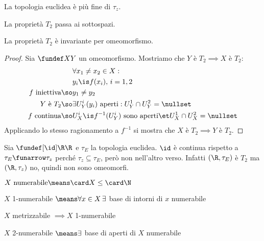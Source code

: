 \begin{oss}
La topologia euclidea è più fine di $\tau_z$.
\end{oss}

\begin{prop}
La proprietà $T_2$ passa ai sottospazi.
\end{prop}

\begin{prop}
La proprietà $T_2$ è invariante per omeomorfismo.
\end{prop}
\begin{proof}
Sia $\fundef XY$ un omeomorfismo. Mostriamo che $Y\text{ è }T_2\implies X\text{ è }T_2$:
\begin{align*}
&\forall x_1\neq x_2\in X:\\
&y_i\is f(x_i),\,i=1,2\\
f\text{ iniettiva}\so&y_1\neq y_2\\
Y\text{ è }T_2\so&\exists U_Y^i(y_i)\text{ aperti}:U_Y^1\cap U_Y^2=\nullset\\
f\text{ continua}\so&U_X^i\is f^{-1}(U_Y^i)\text{ sono aperti}\et U_X^1\cap U_X^2=\nullset
\end{align*}
Applicando lo stesso ragionamento a $f^{-1}$ si mostra che $X\text{ è }T_2\implies Y\text{ è }T_2$.
\end{proof}

\begin{es}
Sia $\fundef[\id]\R\R$ e $\tau_E$ la topologia euclidea. $\id$ è continua rispetto a $\tau_E\funarrow\tau_z$ perché $\tau_z\subseteq\tau_E$, però non nell'altro verso. Infatti $(\R,\tau_E)$ è $T_2$ ma $(\R,\tau_z)$ no, quindi non sono omeomorfi.
\end{es}

\begin{defn}[Numerabilità]
$X\text{ numerabile}\means\card X\leq\card\N$
\end{defn}

\begin{defn}
$X$ 1-numerabile $\means\forall x\in X\,\exists$ base di intorni di $x$ numerabile
\end{defn}

\begin{prop}
$X$ metrizzabile $\implies X$ 1-numerabile
\end{prop}

\begin{defn}
$X$ 2-numerabile $\means\exists$ base di aperti di $X$ numerabile
\end{defn}
